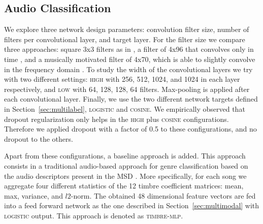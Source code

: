 \documentclass{article}
\begin{document}
\subsection{Audio Classification}\label{sec:audioexp}

We explore three network design parameters: convolution filter size, number of filters per convolutional layer, and target layer. 
For the filter size we compare three approaches: square 3x3 filters as in \cite{Choi2016}, a filter of 4x96 that convolves only in time \cite{Oord2013}, and a musically motivated filter of 4x70, which is able to slightly convolve in the frequency domain \cite{pons2016experimenting}. 
To study the width of the convolutional layers we try with two different settings: \textsc{high} with 256, 512, 1024, and 1024 in each layer respectively, and \textsc{low} with 64, 128, 128, 64 filters. Max-pooling is applied after each convolutional layer.
Finally, we use the two different network targets defined in Section~\ref{sec:multilabel}, \textsc{logistic} and \textsc{cosine}. We empirically observed that dropout regularization only helps in the \textsc{high} plus \textsc{cosine} configurations. Therefore we applied dropout with a factor of 0.5 to these configurations, and no dropout to the others. 

Apart from these configurations, a baseline approach is added. This approach consists in a traditional audio-based approach for genre classification based on the audio descriptors present in the MSD \cite{Bertin-Mahieux2011}.
More specifically, for each song we aggregate four different statistics of the 12 timbre coefficient matrices: mean, max, variance, and $l2$-norm.
The obtained 48 dimensional feature vectors are fed into a feed forward network as the one described in Section~\ref{sec:multimodal} with \textsc{logistic} output.
This approach is denoted as \textsc{timbre-mlp}.
\end{document}
